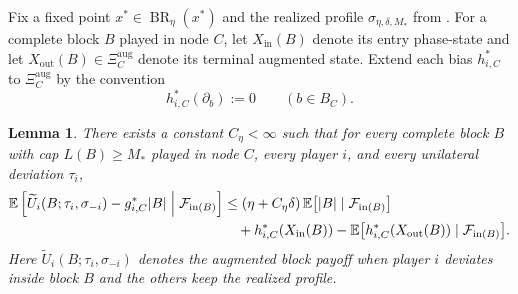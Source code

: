 \documentclass[12pt]{article}
\newtheorem{lemma}[theorem]{Lemma}
\theoremstyle{definition}
\newcommand{\E}{\mathbb{E}}
\newcommand{\1}{\mathbf{1}}
\newcommand{\cF}{\mathcal{F}}
\DeclareMathOperator{\BR}{BR}
\begin{document}
Fix a fixed point $x^*\in\BR_\eta(x^*)$ and the realized profile
$\sigma_{\eta,\delta,M_*}$ from . For a complete block $B$
played in node $C$, let $X_{\mathrm{in}}(B)$ denote its entry phase-state and let
$X_{\mathrm{out}}(B)\in\Xi_C^{\mathrm{aug}}$ denote its terminal augmented state.
Extend each bias $h_{i,C}^*$ to $\Xi_C^{\mathrm{aug}}$ by the convention
\[
h_{i,C}^*(\partial_b):=0
\qquad (b\in B_C).
\]

\begin{lemma}
\label{lem:block-bellman}
There exists a constant $C_\eta<\infty$ such that for every complete block $B$
with cap $L(B)\ge M_*$ played in node $C$, every player $i$, and every unilateral
deviation $\tau_i$,
\begin{equation}
\label{eq:block-bellman-ineq}
\begin{aligned}
\E\left[
\widetilde U_i(B;\tau_i,\sigma_{-i}) - g_{i,C}^*|B|
\Bigm|\cF_{\mathrm{in}(B)}
\right]
&\le
(\eta+C_\eta\delta)\,\E\bigl[|B|\mid \cF_{\mathrm{in}(B)}\bigr]
\\
&\quad+
h_{i,C}^*(X_{\mathrm{in}}(B))
-
\E\bigl[h_{i,C}^*(X_{\mathrm{out}}(B))\mid\cF_{\mathrm{in}(B)}\bigr].
\end{aligned}
\end{equation}
Here $\widetilde U_i(B;\tau_i,\sigma_{-i})$ denotes the augmented block payoff when
player $i$ deviates inside block $B$ and the others keep the realized profile.
\end{lemma}
\end{document}
